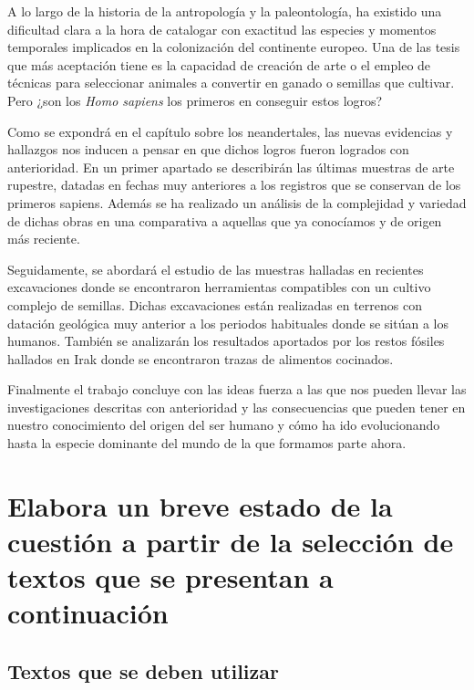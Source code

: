 \documentclass[12pt, a4paper, oneside]{report}
\begin{document}
            A lo largo de la historia de la antropología y la paleontología, ha existido una dificultad clara
            a la hora de catalogar con exactitud las especies y momentos temporales implicados en la
            colonización del continente europeo. Una de las tesis que más aceptación tiene es la capacidad de
            creación de arte o el empleo de técnicas para seleccionar animales a convertir en ganado o
            semillas que cultivar. Pero ¿son los \emph{Homo sapiens} los primeros en conseguir estos logros?

            Como se expondrá en el capítulo sobre los neandertales, las nuevas evidencias y hallazgos nos
            inducen a pensar en que dichos logros fueron logrados con anterioridad. En un primer apartado se
            describirán las últimas muestras de arte rupestre, datadas en fechas muy anteriores a los
            registros que se conservan de los primeros sapiens. Además se ha realizado un análisis de la
            complejidad y variedad de dichas obras en una comparativa a aquellas que ya conocíamos y de origen
            más reciente.

            Seguidamente, se abordará el estudio de las muestras halladas en recientes excavaciones donde se
            encontraron herramientas compatibles con un cultivo complejo de semillas. Dichas excavaciones
            están realizadas en terrenos con datación geológica muy anterior a los periodos habituales donde
            se sitúan a los humanos. También se analizarán los resultados aportados por los restos fósiles
            hallados en Irak donde se encontraron trazas de alimentos cocinados.

            Finalmente el trabajo concluye con las ideas fuerza a las que nos pueden llevar las
            investigaciones descritas con anterioridad y las consecuencias que pueden tener en nuestro
            conocimiento del origen del ser humano y cómo ha ido evolucionando hasta la especie dominante del
            mundo de la que formamos parte ahora.
        \clearpage

        \chapter{Elabora un breve estado de la cuestión a partir de la selección de textos que se presentan a continuación}
            \setcounter{section}{0}
            \section{Textos que se deben utilizar}
\end{document}
